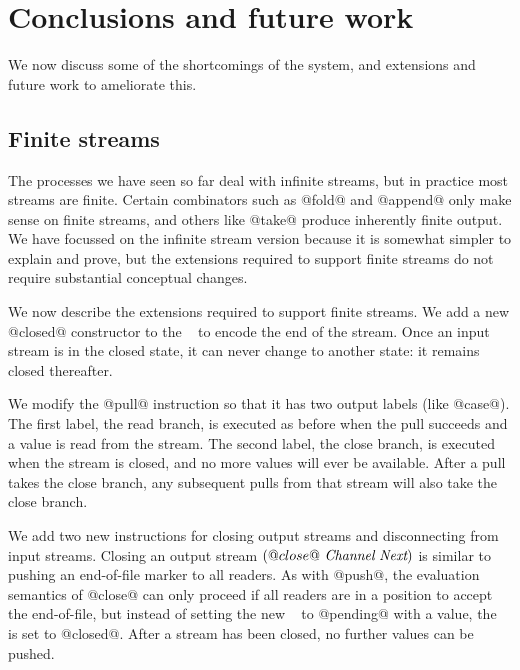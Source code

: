 \section{Conclusions and future work}
\label{s:FutureWork}

We now discuss some of the shortcomings of the system, and extensions and future work to ameliorate this.

\subsection{Finite streams}
\label{s:Finite}

The processes we have seen so far deal with infinite streams, but in practice most streams are finite.
Certain combinators such as @fold@ and @append@ only make sense on finite streams, and others like @take@ produce inherently finite output.
We have focussed on the infinite stream version because it is somewhat simpler to explain and prove, but the extensions required to support finite streams do not require substantial conceptual changes.

We now describe the extensions required to support finite streams.
We add a new @closed@ constructor to the \InputState~ to encode the end of the stream.
Once an input stream is in the closed state, it can never change to another state: it remains closed thereafter.

We modify the @pull@ instruction so that it has two output labels (like @case@).
The first label, the read branch, is executed as before when the pull succeeds and a value is read from the stream.
The second label, the close branch, is executed when the stream is closed, and no more values will ever be available.
After a pull takes the close branch, any subsequent pulls from that stream will also take the close branch.

We add two new instructions for closing output streams and disconnecting from input streams.
Closing an output stream $(@close@~\textit{Channel}~\textit{Next})$ is similar to pushing an end-of-file marker to all readers.
As with @push@, the evaluation semantics of @close@ can only proceed if all readers are in a position to accept the end-of-file, but instead of setting the new \InputState~ to @pending@ with a value, the \InputState~ is set to @closed@.
After a stream has been closed, no further values can be pushed.

